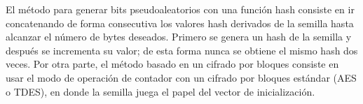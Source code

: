 
El método para generar bits pseudoaleatorios con una función hash consiste en ir
concatenando de forma consecutiva los valores hash derivados de la semilla hasta
alcanzar el número de bytes deseados. Primero se genera un hash de la semilla y
después se incrementa su valor; de esta forma nunca se obtiene el mismo hash dos
veces. Por otra parte, el método basado en un cifrado por bloques consiste en
usar el modo de operación de contador con un cifrado por bloques estándar (AES o
TDES), en donde la semilla juega el papel del vector de inicialización.
